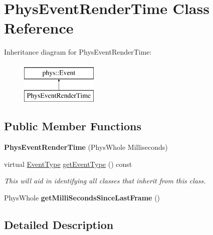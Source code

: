 \hypertarget{classPhysEventRenderTime}{
\section{PhysEventRenderTime Class Reference}
\label{d4/d83/classPhysEventRenderTime}
}
Inheritance diagram for PhysEventRenderTime:\begin{figure}[H]
\begin{center}
\leavevmode
\includegraphics[height=2cm]{d4/d83/classPhysEventRenderTime}
\end{center}
\end{figure}
\subsection*{Public Member Functions}
\begin{DoxyCompactItemize}
\item 
\hypertarget{classPhysEventRenderTime_af6ad859225b0c869af9145844ac5a248}{
{\bfseries PhysEventRenderTime} (PhysWhole Milliseconds)}
\label{d4/d83/classPhysEventRenderTime_af6ad859225b0c869af9145844ac5a248}

\item 
virtual \hyperlink{classphys_1_1Event_af5fdbb3e08d8e578d58770fbc606fda7}{EventType} \hyperlink{classPhysEventRenderTime_a96b0569f8b1cd459383318c9437130d4}{getEventType} () const 
\begin{DoxyCompactList}\small\item\em This will aid in identifying all classes that inherit from this class. \item\end{DoxyCompactList}\item 
\hypertarget{classPhysEventRenderTime_aaba6aa77d58877dc8b3784c1ebcfe7b6}{
PhysWhole {\bfseries getMilliSecondsSinceLastFrame} ()}
\label{d4/d83/classPhysEventRenderTime_aaba6aa77d58877dc8b3784c1ebcfe7b6}

\end{DoxyCompactItemize}


\subsection{Detailed Description}


